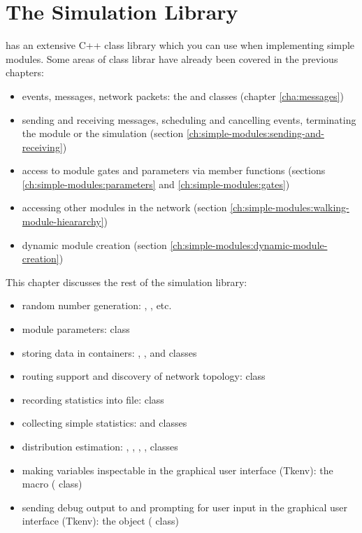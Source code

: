 \chapter{The Simulation Library}
\label{cha:the-simulation-library}

{\opp} has an extensive C++ class library which you can use when implementing
simple modules. Some areas of class librar have already been covered in the
previous chapters:

\begin{itemize}
  \item{events, messages, network packets: the  and
     classes (chapter \ref{cha:messages})}
  \item{sending and receiving messages, scheduling and cancelling
    events, terminating the module or the simulation
    (section \ref{ch:simple-modules:sending-and-receiving})}
  \item{access to module gates and parameters via  member functions
    (sections \ref{ch:simple-modules:parameters} and \ref{ch:simple-modules:gates})}
  \item{accessing other modules in the network (section \ref{ch:simple-modules:walking-module-hieararchy})}
  \item{dynamic module creation (section \ref{ch:simple-modules:dynamic-module-creation})}
\end{itemize}

This chapter discusses the rest of the simulation library:

\begin{itemize}
  \item{random number generation: ,
    , etc.}
  \item{module parameters:  class}
  \item{storing data in containers: ,
    ,  and
     classes}
  \item{routing support and discovery of network topology:  class}
  \item{recording statistics into file:  class}
  \item{collecting simple statistics:  and
     classes}
  \item{distribution estimation: ,
    , , ,
     classes}
  \item{making variables inspectable in the graphical user interface
    (Tkenv): the  macro ( class)}
  \item{sending debug output to and prompting for user input in the graphical
    user interface (Tkenv): the  object ( class)}
\end{itemize}





